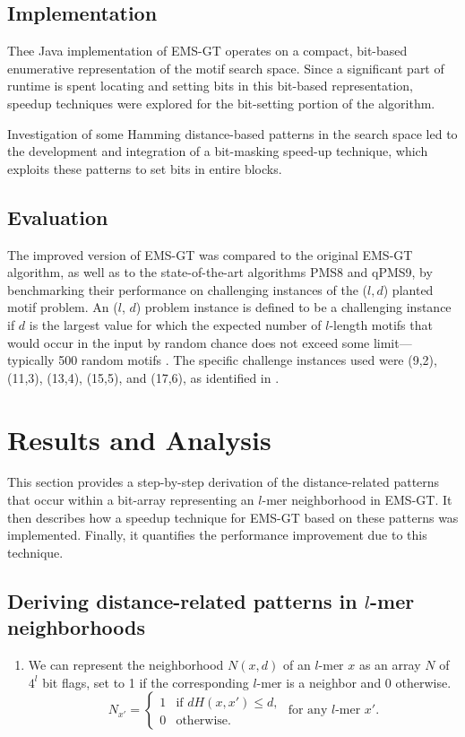 \documentclass[oneside,12pt]{DISCSthesis}
\begin{document}
{	\section{Implementation}
		Thee Java implementation of EMS-GT operates on a compact, bit-based enumerative representation of the motif search space. 
		Since a significant part of runtime is spent locating and setting bits in this bit-based representation, speedup techniques were explored for the bit-setting portion of the algorithm.




		Investigation of some Hamming distance-based patterns in the search space led to the development and integration of a bit-masking speed-up technique, which exploits these patterns to set bits in entire blocks.

	\section{Evaluation}
		The improved version of EMS-GT was compared to the original EMS-GT algorithm, as well as to the state-of-the-art algorithms PMS8 and qPMS9, by benchmarking their performance on challenging instances of the ($l, d$) planted motif problem. An ($l$, $d$) problem instance is defined to be a challenging instance if $d$ is the largest value for which the expected number of $l$-length motifs that would occur in the input by random chance does not exceed some limit---typically 500 random motifs \cite{pms2015}. The specific challenge instances used were (9,2), (11,3), (13,4), (15,5), and (17,6), as identified in \cite{pms2015,pms2007}. 
		\bigskip

\chapter{Results and Analysis}
	This section provides a step-by-step derivation of the distance-related patterns that occur within a bit-array representing an $l$-mer neighborhood in EMS-GT. It then describes how a speedup technique for EMS-GT based on these patterns was implemented. Finally, it quantifies the performance improvement due to this technique.
	
	\section{\boldmath Deriving distance-related patterns in $l$-mer neighborhoods}
		\begin{enumerate}
			\item We can represent the neighborhood $N(x,d)$ of an $l$-mer $x$ as an array $N$ of $4^{l}$ bit flags, set to 1 if the corresponding $l$-mer is a neighbor and 0 otherwise.
				\begin{equation}
					N_{x'} = \left\{
					\begin{array}{rl}
						1 & \text{if } dH(x,x') \leq d,\\
						0 & \text{otherwise.}%
					\end{array} \right.
					\text{ for any $l$-mer }x'.
					\end{equation}


\end{enumerate}}
\end{document}
